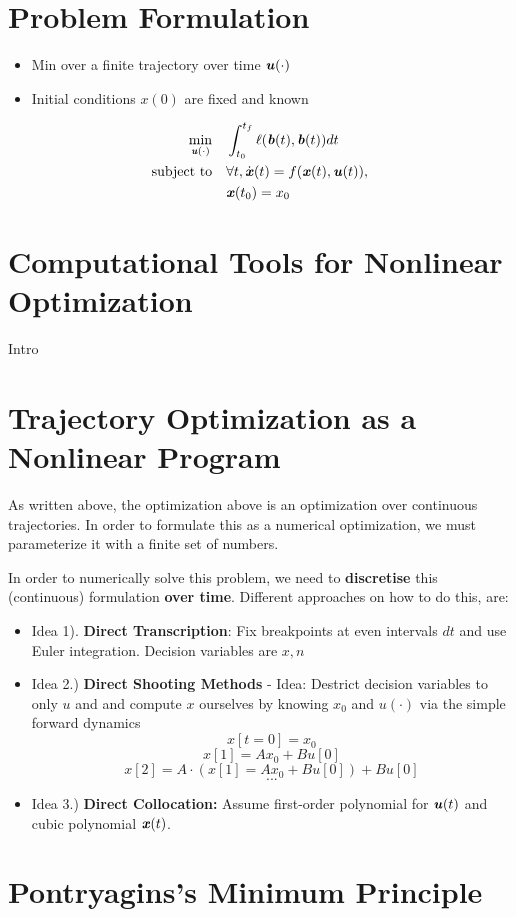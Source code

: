 \section{Problem Formulation}
\begin{itemize}
\item Min over a finite trajectory over time $\bm{\mathit{u}}(\cdot)$
\item Initial conditions $x(0)$ are fixed and known
\end{itemize}
\begin{align*}
\min_{\bm{\mathit{u}}(\cdot)} \quad &
\int_{t_0}^{t_f} \ell(\bm{\mathit{b}}(t),\bm{\mathit{b}}(t)) dt \\ \text{subject to} \quad &
\forall t, \dot{\bm{\mathit{x}}}(t)=f(\bm{\mathit{x}}(t),\bm{\mathit{u}}(t)), \\
& \bm{\mathit{x}}(t_0)=x_0
\end{align*}


\section{Computational Tools for Nonlinear Optimization}
Intro 
\section{Trajectory Optimization as a Nonlinear Program}
As written above, the optimization above is an optimization over continuous trajectories. In order to formulate this as a numerical optimization, we must parameterize it with a finite set of numbers. 

In order to numerically solve this problem, we need to \textbf{discretise} this (continuous) formulation \textbf{over time}. Different approaches on how to do this, are:
\begin{itemize}
\item Idea 1). \textbf{Direct Transcription}: Fix breakpoints at even intervals $dt$ and use Euler integration. Decision variables are $x,n$ 
\item Idea 2.) \textbf{Direct Shooting Methods} - Idea: Destrict decision variables to only $u$ and and compute $x$ ourselves by knowing $x_0$ and $u(\cdot)$ via the simple forward dynamics
$$x[t=0] = x_0$$
$$x[1]=Ax_0+Bu[0]$$
$$x[2]=A\cdot(x[1]=Ax_0+Bu[0])+Bu[0]$$
$$...$$
\item Idea 3.) \textbf{Direct Collocation:} Assume first-order polynomial for $\bm{\mathit{u}}(t)$ and cubic polynomial $\bm{\mathit{x}}(t)$.
\end{itemize}
\section{Pontryagins's Minimum Principle}
